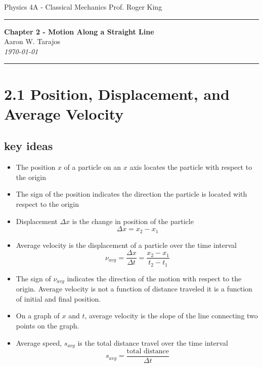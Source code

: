\documentclass{article}
\begin{document}
\noindent
Physics 4A - Classical Mechanics \hfill Prof. Roger King

\noindent\rule{\textwidth}{0.4pt}

\begin{center}
    \textbf{\LARGE Chapter 2 - Motion Along a Straight Line} \\
    \vspace{12pt}
    \large Aaron W. Tarajos \\
    \textit{\today}
\end{center}

\noindent\rule{\textwidth}{0.4pt}

\section*{2.1 Position, Displacement, and Average Velocity}
\subsection*{key ideas}
\begin{itemize}
	\item The position $x$ of a particle on an $x$ axis locates the particle with respect to the origin
	\item The sign of the position indicates the direction the particle is located with respect to the origin
	\item Displacement $\Delta x$ is the change in position of the particle
		\[
			\Delta x = x_2-x_1
		\]
	\item Average velocity is the displacement of a particle over the time interval
		\[
			\nu_{avg} = \frac{\Delta x}{\Delta t} = \frac{x_2 - x_1}{t_2 - t_1}
		\]
	\item The sign of $\nu_{avg}$ indicates the direction of the motion with respect to the origin. Average velocity is not a function of distance traveled it is a function of initial and final position.
	\item On a graph of $x$ and $t$, average velocity is the slope of the line connecting two points on the graph.
	\item Average speed, $s_{avg}$ is the total distance travel over the time interval
		\[
			s_{avg} = \frac{\text{total distance}}{\Delta t}
		\]
\end{itemize}
\end{document}
